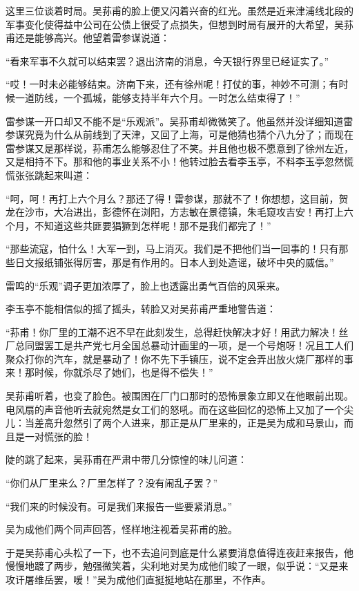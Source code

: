 \par 这里三位谈着时局。吴荪甫的脸上便又闪着兴奋的红光。虽然是近来津浦线北段的军事变化使得益中公司在公债上很受了点损失，但想到时局有展开的大希望，吴荪甫还是能够高兴。他望着雷参谋说道：
\par “看来军事不久就可以结束罢？退出济南的消息，今天银行界里已经证实了。”
\par “哎！一时未必能够结束。济南下来，还有徐州呢！打仗的事，神妙不可测；有时候一道防线，一个孤城，能够支持半年六个月。一时怎么结束得了！”
\par 雷参谋一开口却又不能不是“乐观派”。吴荪甫却微微笑了。他虽然并没详细知道雷参谋究竟为什么从前线到了天津，又回了上海，可是他猜也猜个八九分了；而现在雷参谋又是那样说，荪甫怎么能够忍住了不笑。并且他也极不愿意到了徐州左近，又是相持不下。那和他的事业关系不小！他转过脸去看李玉亭，不料李玉亭忽然慌慌张张跳起来叫道：
\par “呵，呵！再打上六个月么？那还了得！雷参谋，那就不了！你想想，这目前，贺龙在沙市，大冶进出，彭德怀在浏阳，方志敏在景德镇，朱毛窥攻吉安！再打上六个月，不知道这些共匪要猖獗到怎样呢！那不是我们都完了！”
\par “那些流寇，怕什么！大军一到，马上消灭。我们是不把他们当一回事的！只有那些日文报纸铺张得厉害，那是有作用的。日本人到处造谣，破坏中央的威信。”
\par 雷鸣的“乐观”调子更加浓厚了，脸上也透露出勇气百倍的风采来。
\par 李玉亭不能相信似的摇了摇头，转脸又对吴荪甫严重地警告道：
\par “荪甫！你厂里的工潮不迟不早在此刻发生，总得赶快解决才好！用武力解决！丝厂总同盟罢工是共产党七月全国总暴动计画里的一项，是一个号炮呀！况且工人们聚众打你的汽车，就是暴动了！你不先下手镇压，说不定会弄出放火烧厂那样的事来！那时候，你就杀尽了她们，也是得不偿失！”
\par 吴荪甫听着，也变了脸色。被围困在厂门口那时的恐怖景象立即又在他眼前出现。电风扇的声音他听去就宛然是女工们的怒吼。而在这些回忆的恐怖上又加了一个尖儿：当差高升忽然引了两个人进来，那正是从厂里来的，正是吴为成和马景山，而且是一对慌张的脸！
\par 陡的跳了起来，吴荪甫在严肃中带几分惊惶的味儿问道：
\par “你们从厂里来么？厂里怎样了？没有闹乱子罢？”
\par “我们来的时候没有。可是我们来报告一些要紧消息。”
\par 吴为成他们两个同声回答，怪样地注视着吴荪甫的脸。
\par 于是吴荪甫心头松了一下，也不去追问到底是什么紧要消息值得连夜赶来报告，他慢慢地踱了两步，勉强微笑着，尖利地对吴为成他们睃了一眼，似乎说：“又是来攻讦屠维岳罢，嗳！”吴为成他们直挺挺地站在那里，不作声。
